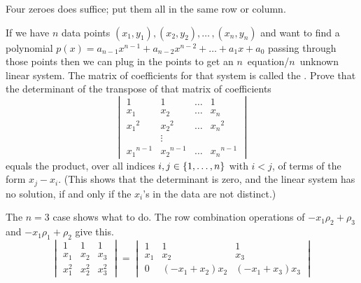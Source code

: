 \begin{exercises}
\begin{answer}
      Four zeroes does suffice; put them all in the same  
      row or column.
    \end{answer}
  \recommended \item
    If we have \( n \) data points
    \( (x_1,y_1),(x_2,y_2),\dots\,,(x_n,y_n) \) and want to find a
    polynomial \( p(x)=a_{n-1}x^{n-1}+a_{n-2}x^{n-2}+\dots+a_1x+a_0 \)
    passing through those points
    then we can plug in the points to get an \( n \)~equation/\( n \)~unknown
    linear system.
    The matrix of coefficients for that system is called the
    .%
    Prove that the determinant of the transpose of that matrix of coefficients
    \begin{equation*}
      \begin{vmatrix}
         1       &1       &\ldots   &1       \\
         x_1     &x_2     &\ldots   &x_n     \\
         {x_1}^2 &{x_2}^2 &\ldots   &{x_n}^2 \\
                 &\vdots                     \\
         {x_1}^{n-1} &{x_2}^{n-1}   &\ldots   &{x_n}^{n-1}
      \end{vmatrix}
    \end{equation*}
    equals the product, over all indices \( i,j\in\mbox{$\{1,\dots,n\}$} \) with
    \( i<j \), of terms of the form \( x_j-x_i \).
    (This shows that 
    the determinant is zero, and the linear system has no solution,
    if and only if the \( x_i \)'s in the data are not distinct.)
    \begin{answer}
      The $n=3$ case shows what to do.
      The row combination operations of 
      $-x_1\rho_2+\rho_3$ and $-x_1\rho_1+\rho_2$
      give this.
      \begin{equation*}
        \begin{vmatrix}
          1     &1     &1     \\
          x_1   &x_2   &x_3   \\
          x_1^2 &x_2^2 &x_3^2 
        \end{vmatrix}
        =
        \begin{vmatrix}
          1     &1             &1             \\
          x_1   &x_2           &x_3           \\
          0     &(-x_1+x_2)x_2 &(-x_1+x_3)x_3 
        \end{vmatrix}

\end{equation*}
\end{answer}
\end{exercises}
